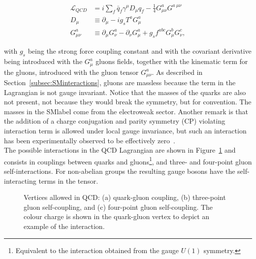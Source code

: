 \begin{equation}
\label{Theory_eq:diraceq30}
\begin{split}
    \mathcal{L}_{QCD} &= i\sum_f \bar{q}_f\gamma^\mu D_\mu q_f - \frac{1}{4}G_{\mu\nu}^aG^{a\ \mu\nu} \\
    D_{\mu \ } &\equiv \partial_\mu -ig_sT^aG^a_\mu \\
    G_{\mu\nu}^a &\equiv \partial_\mu G_\nu^a - \partial_\nu G_\mu^a + g_s f^{abc}G_\mu^b G_\nu^c,
\end{split}
\end{equation}

with $g_s$ being the strong force coupling constant and with the covariant derivative being introduced
with the $G_\mu^a$ gluons fields, together with the kinematic term for the gluons, introduced with the gluon tensor $G_{\mu\nu}^a$.
As described in Section~\ref{subsec:SMinteractions}, gluons are massless because the term in the Lagrangian is not gauge invariant.
Notice that the masses of the quarks are also not present, not because they would break the symmetry, but for convention.
The masses in the \acrshort{SMlabel} come from the electroweak sector.
Another remark is that the addition of a charge conjugation and parity symmetry (CP)
violating interaction term is allowed under local gauge invariance, but such an interaction has been experimentally observed
to be effectively zero~\cite{PhysRevLett.124.081803}.\\

The possible interactions in the QCD Lagrangian are shown in Figure~\ref{figSM:QCDfey} and consists in couplings between quarks and gluons\footnote{Equivalent to the interaction obtained from the gauge $U(1)$ symmetry.}, and three- and four-point gluon self-interactions. For non-abelian groups the resulting gauge bosons have the self-interacting terms in the tensor.

\begin{figure}[htbp]
    \RawFloats
    \begin{center}
    \quad
    \quad
    \caption{Vertices allowed in QCD: (a) quark-gluon coupling, (b) three-point gluon self-coupling, and (c) four-point gluon self-coupling. The colour charge is shown in the quark-gluon vertex to depict an example of the interaction.}
    \label{figSM:QCDfey}
    \end{center}
\end{figure}


